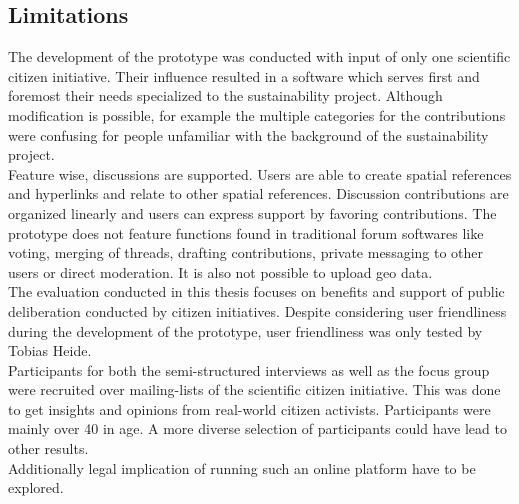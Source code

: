 \subsection{Limitations}
\label{sub:limitations}
The development of the prototype was conducted with input of only one scientific citizen initiative. Their influence resulted in a software which serves first and foremost their needs specialized to the sustainability project. Although modification is possible, for example the multiple categories for the contributions were confusing for people unfamiliar with the background of the sustainability project.\\
Feature wise, discussions are supported. Users are able to create spatial references and hyperlinks and relate to other spatial references. Discussion contributions are organized linearly and users can express support by favoring contributions. The prototype does not feature functions found in traditional forum softwares like voting, merging of threads, drafting contributions, private messaging to other users or direct moderation. It is also not possible to upload geo data.\\%
The evaluation conducted in this thesis focuses on benefits and support of public deliberation conducted by citizen initiatives. Despite considering user friendliness during the development of the prototype, user friendliness was only tested by Tobias Heide.\\
Participants for both the semi-structured interviews as well as the focus group were recruited over mailing-lists of the scientific citizen initiative. This was done to get insights and opinions from real-world citizen activists. Participants were mainly over 40 in age. A more diverse selection of participants could have lead to other results.\\
Additionally legal implication of running such an online platform have to be explored.



